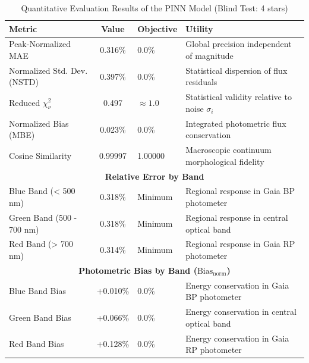
\begin{table}[htpb]
\centering
\caption{Quantitative Evaluation Results of the PINN Model (Blind Test: 4 stars)}
\label{tab:pinn_evaluation}
\begin{tabular}{lcll}
\hline
\textbf{Metric} & \textbf{Value} & \textbf{Objective} & \textbf{Utility} \\
\hline
Peak-Normalized MAE & 0.316\% & 0.0\% & Global precision independent of magnitude \\
Normalized Std. Dev. (NSTD) & 0.397\% & 0.0\% & Statistical dispersion of flux residuals \\
Reduced $\chi^2_\nu$ & 0.497 & $\approx 1.0$ & Statistical validity relative to noise $\sigma_i$ \\
Normalized Bias (MBE) & 0.023\% & 0.0\% & Integrated photometric flux conservation \\
Cosine Similarity & 0.99997 & 1.00000 & Macroscopic continuum morphological fidelity \\
\hline
\multicolumn{4}{c}{\textbf{Relative Error by Band}} \\
\hline
Blue Band (< 500 nm) & 0.318\% & Minimum & Regional response in Gaia BP photometer \\
Green Band (500 - 700 nm) & 0.318\% & Minimum & Regional response in central optical band \\
Red Band (> 700 nm) & 0.314\% & Minimum & Regional response in Gaia RP photometer \\
\hline
\multicolumn{4}{c}{\textbf{Photometric Bias by Band ($\text{Bias}_{\text{norm}}$)}} \\
\hline
Blue Band Bias & +0.010\% & 0.0\% & Energy conservation in Gaia BP photometer \\
Green Band Bias & +0.066\% & 0.0\% & Energy conservation in central optical band \\
Red Band Bias & +0.128\% & 0.0\% & Energy conservation in Gaia RP photometer \\
\hline
\end{tabular}
\end{table}

